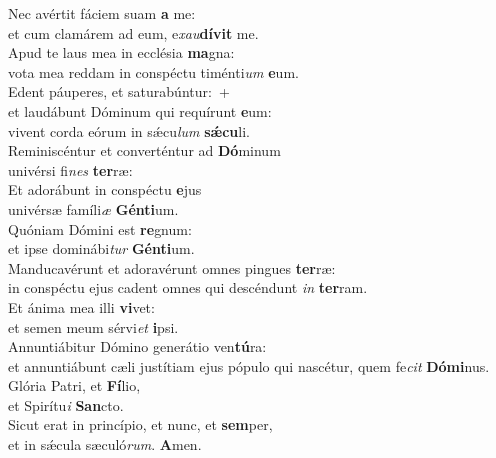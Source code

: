 \evenverse Nec avértit fáciem suam \textbf{a} me:~\*\\
\evenverse et cum clamárem ad eum, e\textit{xau}\textbf{dí}\textbf{vit} me.\\
\oddverse Apud te laus mea in ecclésia \textbf{ma}gna:~\*\\
\oddverse vota mea reddam in conspéctu timénti\textit{um} \textbf{e}um.\\
\evenverse Edent páuperes, et saturabúntur:~+\\
\evenverse  et laudábunt Dóminum qui requírunt \textbf{e}um:~\*\\
\evenverse vivent corda eórum in sǽcu\textit{lum} \textbf{sǽ}\textbf{cu}li.\\
\oddverse Reminiscéntur et converténtur ad \textbf{Dó}minum~\*\\
\oddverse univérsi fi\textit{nes} \textbf{ter}ræ:\\
\evenverse Et adorábunt in conspéctu \textbf{e}jus~\*\\
\evenverse univérsæ famíli\textit{æ} \textbf{Gén}\textbf{ti}um.\\
\oddverse Quóniam Dómini est \textbf{re}gnum:~\*\\
\oddverse et ipse dominábi\textit{tur} \textbf{Gén}\textbf{ti}um.\\
\evenverse Manducavérunt et adoravérunt omnes pingues \textbf{ter}ræ:~\*\\
\evenverse in conspéctu ejus cadent omnes qui descéndunt \textit{in} \textbf{ter}ram.\\
\oddverse Et ánima mea illi \textbf{vi}vet:~\*\\
\oddverse et semen meum sérvi\textit{et} \textbf{i}psi.\\
\evenverse Annuntiábitur Dómino generátio ven\textbf{tú}ra:~\*\\
\evenverse et annuntiábunt cæli justítiam ejus pópulo qui nascétur, quem fe\textit{cit} \textbf{Dó}\textbf{mi}nus.\\
\oddverse Glória Patri, et \textbf{Fí}lio,~\*\\
\oddverse et Spirítu\textit{i} \textbf{San}cto.\\
\evenverse Sicut erat in princípio, et nunc, et \textbf{sem}per,~\*\\
\evenverse et in sǽcula sæculó\textit{rum}. \textbf{A}men.\\
